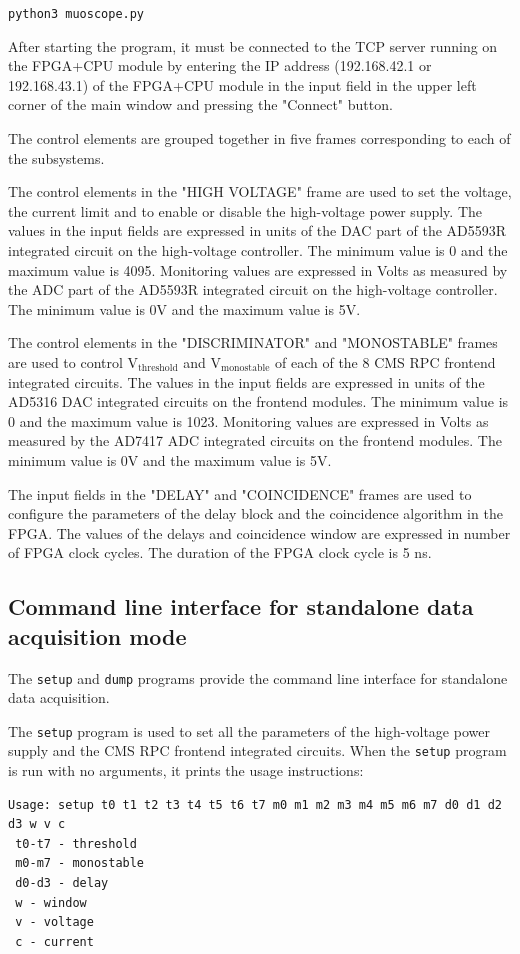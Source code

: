 \documentclass[12pt, a4paper]{article}
\begin{document}
\texttt{python3 muoscope.py}

After starting the program, it must be connected to the TCP server running on the FPGA+CPU module by entering the IP address (192.168.42.1 or 192.168.43.1) of the FPGA+CPU module in the input field in the upper left corner of the main window and pressing the "Connect" button.

The control elements are grouped together in five frames corresponding to each of the subsystems.

The control elements in the "HIGH VOLTAGE" frame are used to set the voltage, the current limit and to enable or disable the high-voltage power supply. The values in the input fields are expressed in units of the DAC part of the AD5593R integrated circuit on the high-voltage controller. The minimum value is 0 and the maximum value is 4095. Monitoring values are expressed in Volts as measured by the ADC part of the AD5593R integrated circuit on the high-voltage controller. The minimum value is 0V and the maximum value is 5V.

The control elements in the "DISCRIMINATOR" and "MONOSTABLE" frames are used to control $\text{V}_\text{threshold}$ and $\text{V}_\text{monostable}$ of each of the 8 CMS RPC frontend integrated circuits. The values in the input fields are expressed in units of the AD5316 DAC integrated circuits on the frontend modules. The minimum value is 0 and the maximum value is 1023. Monitoring values are expressed in Volts as measured by the AD7417 ADC integrated circuits on the frontend modules. The minimum value is 0V and the maximum value is 5V.

The input fields in the "DELAY" and "COINCIDENCE" frames are used to configure the parameters of the delay block and the coincidence algorithm in the FPGA. The values of the delays and coincidence window are expressed in number of FPGA clock cycles. The duration of the FPGA clock cycle is 5 ns.

\subsection{Command line interface for standalone data acquisition mode}

The \texttt{setup} and \texttt{dump} programs provide the command line interface for standalone data acquisition.

The \texttt{setup} program is used to set all the parameters of the high-voltage power supply and the CMS RPC frontend integrated circuits. When the \texttt{setup} program is run with no arguments, it prints the usage instructions:
\vspace{-1ex}
\begin{verbatim}
Usage: setup t0 t1 t2 t3 t4 t5 t6 t7 m0 m1 m2 m3 m4 m5 m6 m7 d0 d1 d2 d3 w v c
 t0-t7 - threshold
 m0-m7 - monostable
 d0-d3 - delay
 w - window
 v - voltage
 c - current
\end{verbatim}
\end{document}
